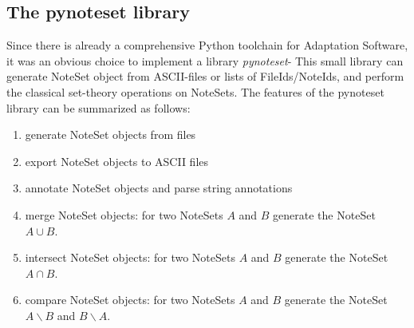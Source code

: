\subsection{The pynoteset library}
Since there is already a comprehensive Python toolchain for Adaptation Software, it was an obvious choice to implement a library  \emph{pynoteset}-  This small library can generate NoteSet object from ASCII-files or lists of FileIds/NoteIds, and perform the classical set-theory operations on NoteSets. The features of the pynoteset library can be summarized as follows: 
\begin{enumerate}
\item generate NoteSet objects from files
\item export NoteSet objects to ASCII files
\item annotate NoteSet objects and parse string annotations
\item merge NoteSet objects: for two NoteSets $A$ and $B$ generate the NoteSet $A \cup B$.
\item intersect NoteSet objects: for two NoteSets $A$ and $B$ generate the NoteSet $A \cap B$.
\item compare NoteSet objects: for two NoteSets $A$ and $B$ generate the NoteSet $A\backslash B$ and $B\backslash A$. 
\end{enumerate}

